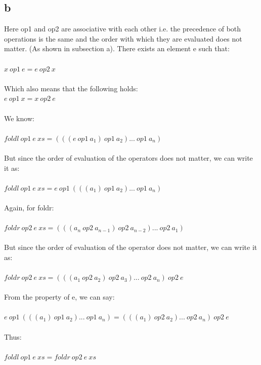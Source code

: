\documentclass{article}
\begin{document}
    \subsection{b}
    Here op1 and op2 are associative with each other i.e. the precedence of both operations is the same and the order with which they are evaluated does not matter. (As shown in subsection a).
    There exists an element e such that:\\
    \\
    $x \  op1 \  e = e \  op2 \  x$\\
    \\
    Which also means that the following holds:\\
    $e \  op1 \  x = x \  op2 \  e$\\
    \\
    We know:\\
    \\
    $foldl \  op1 \  e \  xs = (((e \  op1 \  a_1) \  op1 \  a_2)...\  op1 \  a_n)$\\
    \\
    But since the order of evaluation of the operators does not matter, we can write it as:\\
    \\
    $foldl \  op1 \  e \  xs = e \  op1 \  (((a_1) \  op1 \  a_2)...\  op1 \  a_n)$\\
    \\
    Again, for foldr:\\
    \\
    $foldr \  op2\  e \  xs = (((a_n \  op2 \  a_{n-1}) \  op2 \  a_{n-2})...\  op2 \  a_1)$\\
    \\
    But since the order of evaluation of the operator does not matter, we can write it as:\\
    \\
    $foldr \  op2 \  e \  xs = (((a_1 \  op2 \  a_2) \  op2 \  a_3)...\  op2 \  a_n) \  op2 \  e$\\
    \\
    From the property of e, we can say:\\
    \\
    $e \  op1 \  (((a_1) \  op1 \  a_2)...\  op1 \  a_n) = (((a_1) \  op2 \  a_2)...\  op2 \  a_n) \  op2 \  e$\\
    \\
    Thus:\\
    \\
    $foldl \  op1 \  e \  xs = foldr \  op2 \  e \  xs$\\
    \\
    \pagebreak
\end{document}
